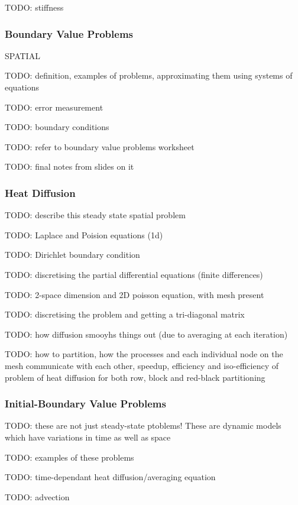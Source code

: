 \documentclass{article}
\begin{document}
TODO: stiffness

\subsubsection{Boundary Value Problems}

SPATIAL

TODO: definition, examples of problems, approximating them using systems of equations

TODO: error measurement

TODO: boundary conditions

TODO: refer to boundary value problems worksheet

TODO: final notes from slides on it

\subsubsection{Heat Diffusion}

TODO: describe this steady state spatial problem

TODO: Laplace and Poision equations (1d)

TODO: Dirichlet boundary condition

TODO: discretising the partial differential equations (finite differences)

TODO: 2-space dimension and 2D poisson equation, with mesh present

TODO: discretising the problem and getting a tri-diagonal matrix

TODO: how diffusion smooyhs things out (due to averaging at each iteration)

TODO: how to partition, how the processes and each individual node on the mesh communicate with each other, speedup, efficiency and iso-efficiency of problem of heat diffusion for both row, block and red-black partitioning

\subsubsection{Initial-Boundary Value Problems}

TODO:  these are not just steady-state ptoblems! These are dynamic models which have variations in time as well as space

TODO: examples of these problems

TODO: time-dependant heat diffusion/averaging equation

TODO: advection
\end{document}
